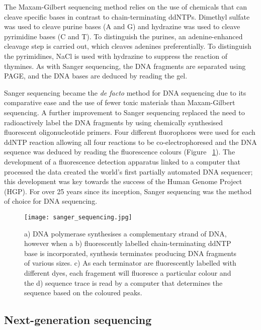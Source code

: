 The Maxam-Gilbert sequencing method\cite{pmid265521} relies on the use of chemicals that can cleave specific bases in contrast to chain-terminating ddNTPs. Dimethyl sulfate was used to cleave purine bases (A and G) and hydrazine was used to cleave pyrimidine bases (C and T). To distinguish the purines, an adenine-enhanced cleavage step is carried out, which cleaves adenines preferentially. To distinguish the pyrimidines, NaCl is used with hydrazine to suppress the reaction of thymines. As with Sanger sequencing, the DNA fragments are separated using PAGE, and the DNA bases are deduced by reading the gel.

Sanger sequencing became the \textit{de facto} method for DNA sequencing due to its comparative ease and the use of fewer toxic materials than Maxam-Gilbert sequencing. A further improvement to Sanger sequencing replaced the need to radioactively label the DNA fragments by using chemically synthesised fluorescent oligonucleotide primers\cite{pmid3713851}. Four different fluorophores were used for each ddNTP reaction allowing all four reactions to be co-electrophoresed and the DNA sequence was deduced by reading the fluorescence colours (Figure ~\ref{fig:sanger_sequencing}). The development of a fluorescence detection apparatus linked to a computer that processed the data created the world's first partially automated DNA sequencer\cite{pmid3713851}; this development was key towards the success of the Human Genome Project (HGP). For over 25 years since its inception, Sanger sequencing was the method of choice for DNA sequencing.

\begin{figure}[!ht]
   \centering
   \texttt{[image: sanger\_sequencing.jpg]}
   \caption[Sanger sequencing]{a) DNA polymerase synthesises a complementary strand of DNA, however when a b) fluorescently labelled chain-terminating ddNTP base is incorporated, synthesis terminates producing DNA fragments of various sizes. c) As each terminator are fluorescently labelled with different dyes, each fragement will fluoresce a particular colour and the d) sequence trace is read by a computer that determines the sequence based on the coloured peaks.}
   \label{fig:sanger_sequencing}
\end{figure}

\subsection{Next-generation sequencing}

